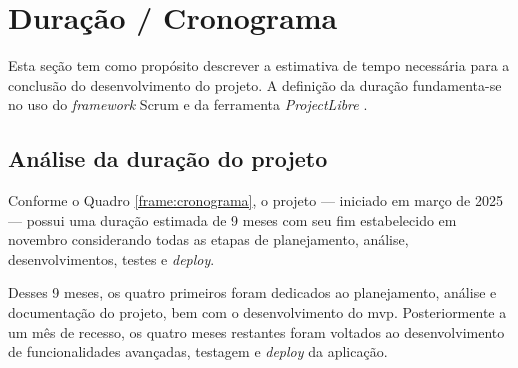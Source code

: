 \section{Duração / Cronograma}

Esta seção tem como propósito descrever a estimativa de tempo necessária para a conclusão do desenvolvimento do projeto. A definição da duração fundamenta-se no uso do \textit{framework} Scrum \cite{scrum-2024} e da ferramenta \emph{ProjectLibre} \cite{projectlibre-2025}.

\subsection{Análise da duração do projeto}

Conforme o Quadro \ref{frame:cronograma}, o projeto --- iniciado em março de 2025 --- possui uma duração estimada de 9 meses com seu fim estabelecido em novembro considerando todas as etapas de planejamento, análise, desenvolvimentos, testes e \textit{deploy}.

Desses 9 meses, os quatro primeiros foram dedicados ao planejamento, análise e documentação do projeto, bem com o desenvolvimento do \gls{mvp}. Posteriormente a um mês de recesso, os quatro meses restantes foram voltados ao desenvolvimento de funcionalidades avançadas, testagem e \textit{deploy} da aplicação.

